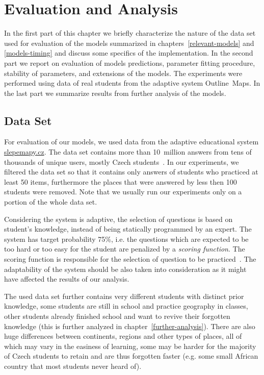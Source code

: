 \chapter{Evaluation and Analysis}

In the first part of this chapter we briefly characterize the nature of the data set used for evaluation of the models summarized in chapters~\ref{relevant-models} and \ref{models-timing} and discuss some specifics of the implementation. In the second part we report on evaluation of models predictions, parameter fitting procedure, stability of parameters, and extensions of the models. The experiments were performed using data of real students from the adaptive system Outline~Maps. In the last part we summarize results from further analysis of the models.

\section{Data Set}

For evaluation of our models, we used data from the adaptive educational system \url{slepemapy.cz}. The data set contains more than 10~million answers from tens of thousands of unique users, mostly Czech students~\cite{Papousek2015}. In our experiments, we filtered the data set so that it contains only answers of students who practiced at least 50 items, furthermore the places that were answered by less then 100 students were removed. Note that we usually run our experiments only on a portion of the whole data set.

Considering the system is adaptive, the selection of questions is based on student's knowledge, instead of being statically programmed by an expert. The system has target probability 75\%, i.e. the questions which are expected to be too hard or too easy for the student are penalized by a \textit{scoring function}. The scoring function is responsible for the selection of question to be practiced~\cite{Stanislav2015thesis}. The adaptability of the system should be also taken into consideration as it might have affected the results of our analysis.

The used data set further contains very different students with distinct prior knowledge, some students are still in school and practice geography in classes, other students already finished school and want to revive their forgotten knowledge (this is further analyzed in chapter~\ref{further-analysis}). There are also huge differences between continents, regions and other types of places, all of which may vary in the easiness of learning, some may be harder for the majority of Czech students to retain and are thus forgotten faster (e.g. some small African country that most students never heard of).

